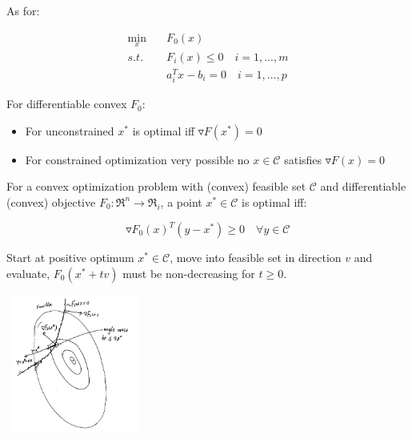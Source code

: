 As for: 

\begin{align*}
\min_x\quad & F_0(x) \\
s.t.\quad & F_i(x) \leq 0 \quad i = 1,...,m\\
& a_i^Tx - b_i = 0\quad i = 1,...,p
\end{align*}


For differentiable convex $F_0$:

\begin{itemize}
	\item For unconstrained $x^*$ is optimal iff $\triangledown F(x^*) = 0$
	
	\item For constrained optimization very possible no $x\in \mathcal{C}$ satisfies $\triangledown F(x) = 0$
\end{itemize}

\begin{theorem}
	For a convex optimization problem with (convex) feasible set $\mathcal{C}$ and differentiable (convex) objective $F_0: \Re^n \rightarrow \Re_i$, a point $x^* \in \mathcal{C}$ is optimal iff:
	
	\begin{equation*}
	\triangledown F_0(x)^T(y - x^*) \geq 0  \quad \forall y \in \mathcal{C}
	\end{equation*}
\end{theorem}

Start at positive optimum $x^*\in \mathcal{C}$, move into feasible set in direction $v$ and evaluate, $F_0(x^*+tv)$ must be non-decreasing for $t\geq 0$.

\begin{marginfigure}
\centering
\includegraphics[width=1.8in,height=1.8in]{figures/ch09/figure1113_1.png}
\end{marginfigure}

